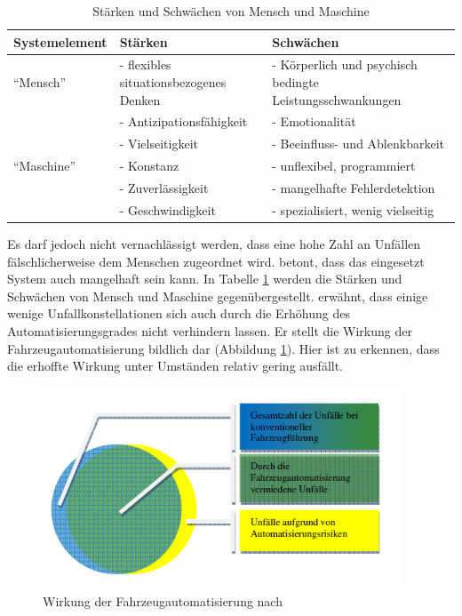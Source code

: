 \begin{table}[htpb]
	\scriptsize
	\caption[Stärken und Schwächen von Mensch und Maschine]{Stärken und Schwächen von Mensch und Maschine \parencite[S. 147]{Huguenin.2017} }\label{tab:Mensch vs. Maschine}
	\centering
	\begin{tabular}{l p{5cm} p{7cm}}
		\toprule
		Systemelement & Stärken & Schwächen \\
		\midrule
		\enquote{Mensch} & - flexibles situationsbezogenes Denken & - Körperlich und psychisch bedingte Leistungsschwankungen \\
		 & - Antizipationsfähigkeit & - Emotionalität \\
		 & - Vielseitigkeit & - Beeinfluss- und Ablenkbarkeit \\
		\midrule		 
		\enquote{Maschine} & - Konstanz & - unflexibel, programmiert \\
		 & - Zuverlässigkeit & - mangelhafte Fehlerdetektion \\
		 & - Geschwindigkeit & - spezialisiert, wenig vielseitig \\		 
		\bottomrule
	\end{tabular}
\end{table}

Es darf jedoch nicht vernachlässigt werden, dass eine hohe Zahl an Unfällen fälschlicherweise dem Menschen zugeordnet wird. \Textcite[S. 147]{Huguenin.2017} betont, dass das eingesetzt System auch mangelhaft sein kann. In Tabelle \ref{tab:Mensch vs. Maschine} werden die Stärken und Schwächen von Mensch und Maschine gegenübergestellt. \Textcite[S. 5]{Gasser.2011} erwähnt, dass einige wenige Unfallkonstellationen sich auch durch die Erhöhung des Automatisierungsgrades nicht verhindern lassen. Er stellt die Wirkung der Fahrzeugautomatisierung bildlich dar (Abbildung \ref{fig:Wirkung_Fahrzeugautomatisierung}). Hier ist zu erkennen, dass die erhoffte Wirkung unter Umständen relativ gering ausfällt.

\begin{savenotes}
	\begin{figure}[H]
		\centering
		\includegraphics[width=10.7cm,height=6cm]{figures/Wirkung_Fahrzeugautomatisierung}
		\caption[Wirkung der Fahrzeugautomatisierung]{Wirkung der Fahrzeugautomatisierung nach \Textcite[S. 5]{Gasser.2011}}\label{fig:Wirkung_Fahrzeugautomatisierung}
	\end{figure}
\end{savenotes}

